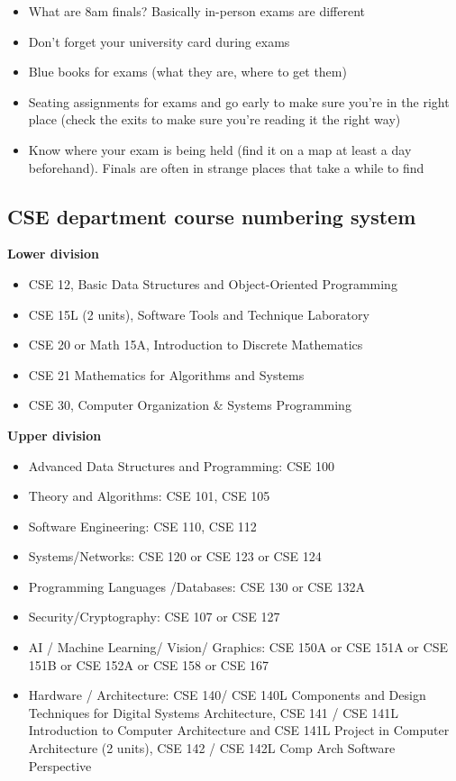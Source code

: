 \documentclass[12pt, oneside]{article}
\begin{document}
\begin{itemize}
\begin{itemize}
\item What are 8am finals? Basically in-person exams are different
\item Don't forget your university card during exams
\item Blue books for exams (what they are, where to get them) 
\item Seating assignments for exams and go early to make sure you're in the right place (check the exits to make sure you're reading it the right way) 
\item Know where your exam is being held (find it on a map at least a day beforehand). Finals are often in strange places that take a while to find 
\end{itemize}
\end{itemize}

\subsection*{CSE department course numbering system}

{\bf Lower division}

\begin{itemize}
\setlength\itemsep{-2pt}
\item CSE 12, Basic Data Structures and Object-Oriented Programming 
\item CSE 15L (2 units), Software Tools and Technique Laboratory 
\item CSE 20 or Math 15A, Introduction to Discrete Mathematics
\item CSE 21 Mathematics for Algorithms and Systems
\item CSE 30, Computer Organization \& Systems Programming
\end{itemize}

{\bf Upper division}

\begin{itemize}
\setlength\itemsep{-2pt}
\item Advanced Data Structures and Programming: CSE 100
\item Theory and Algorithms: CSE 101, CSE 105
\item Software Engineering: CSE 110, CSE 112
\item Systems/Networks: CSE 120 or CSE 123 or CSE 124
\item Programming Languages /Databases: CSE 130 or CSE 132A
\item Security/Cryptography: CSE 107 or CSE 127
\item AI / Machine Learning/ Vision/ Graphics:
CSE 150A or CSE 151A or CSE 151B or CSE 152A or CSE 158 or CSE 167
\item Hardware / Architecture: CSE 140/ CSE 140L Components and Design Techniques for Digital Systems Architecture, CSE 141 / CSE 141L Introduction to Computer Architecture and CSE 141L Project in Computer Architecture (2 units), CSE 142 / CSE 142L Comp Arch Software Perspective
\end{itemize}
\end{document}
